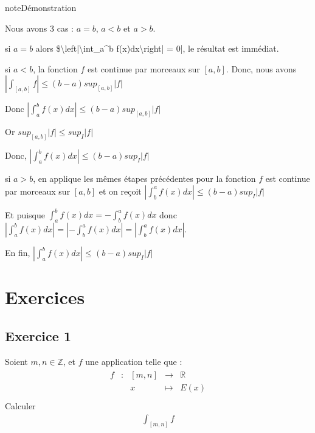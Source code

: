 \documentclass[letterpaper,10pt,french]{sphinxmanual}
\begin{document}
\begin{sphinxadmonition}{note}{Démonstration}

\sphinxAtStartPar
Nous avons 3 cas : \(a=b\), \(a<b\) et \(a>b\).

\sphinxhyphen{} si \(a=b\) alors \$\textbackslash{}left|\textbackslash{}int\_a\textasciicircum{}b f(x)dx\textbackslash{}right| = 0|, le résultat est immédiat.

\sphinxhyphen{} si \(a<b\), la fonction \(f\) est continue par morceaux sur \([a, b]\). Donc, nous avons \(\left|\int_{[a, b]}f \right| \leq (b-a)sup_{[a, b]}|f|\)

\sphinxAtStartPar
Donc \(\left|\int_{a}^bf(x)dx \right| \leq (b-a)sup_{[a, b]}|f|\)

\sphinxAtStartPar
Or \(sup_{[a, b]}|f| \leq sup_{I}|f|\)

\sphinxAtStartPar
Donc, \(\left|\int_{a}^bf(x)dx \right| \leq (b-a)sup_{I}|f|\)

\sphinxhyphen{} si \(a>b\), en applique les mêmes étapes précédentes pour la fonction \(f\) est continue par morceaux sur \([a, b]\) et on reçoit \(\left|\int_{b}^af(x)dx \right| \leq (b-a)sup_{I}|f|\)

\sphinxAtStartPar
Et puisque \(\int_a^b f(x)dx = - \int_b^a f(x)dx\) donc \(\left|\int_a^b f(x)dx\right| = \left|- \int_b^a f(x)dx\right| = \left| \int_b^a f(x)dx\right|\).

\sphinxAtStartPar
En fin, \(\left|\int_{a}^bf(x)dx \right| \leq (b-a)sup_{I}|f|\)
\end{sphinxadmonition}


\section{Exercices}
\label{\detokenize{exo1:exercices}}\label{\detokenize{exo1::doc}}

\subsection{Exercice 1}
\label{\detokenize{exo1:exercice-1}}
\sphinxhyphen{} Soient \(m, n \in \mathbb Z\), et \(f\) une application telle que :
\begin{equation*}
\begin{split}
\begin{array}{ccccc}
f & : & [m, n] & \to & \mathbb R \\
 & & x & \mapsto & E(x)\\
\end{array}
\end{split}
\end{equation*}
\sphinxAtStartPar
Calculer
\begin{equation*}
\begin{split}
\int_{[m, n]} f
\end{split}
\end{equation*}
\end{document}
